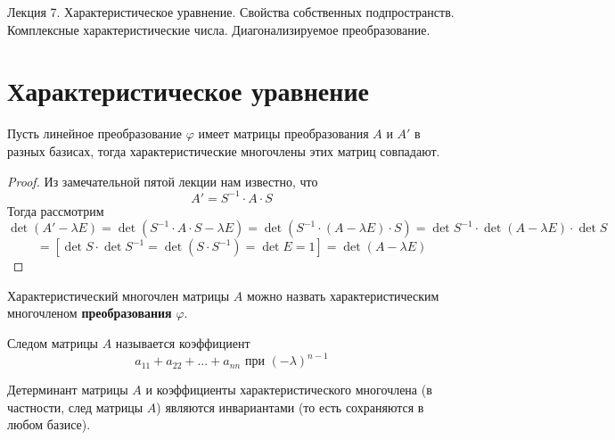 \documentclass[11pt]{article}
\begin{document}
\begin{titlepage}
    \centering
    \vspace*{\fill}  %

    {\Huge Лекция 7. Характеристическое уравнение. Свойства собственных подпространств.
    Комплексные характеристические числа. Диагонализируемое преобразование. 
    \par}

    \vspace*{\fill}  %
\end{titlepage}

\setcounter{page}{1}

\section{Характеристическое уравнение}

\begin{theorem}
    Пусть линейное преобразование $\varphi$ имеет матрицы преобразования $A$ и $A'$
    в разных базисах, тогда характеристические многочлены этих матриц совпадают.
\end{theorem}

\begin{proof}
    Из замечательной пятой лекции нам известно, что \[A' = S^{-1} \cdot A \cdot S\]
    Тогда рассмотрим \[\det(A' - \lambda E) = \det(S^{-1} \cdot A \cdot S - \lambda E) =
    \det(S^{-1} \cdot (A - \lambda E) \cdot S) = \det S^{-1} \cdot \det(A - \lambda E) \cdot \det S\]
    \[= [\det S \cdot \det S^{-1} = \det (S \cdot S^{-1}) = \det E = 1] = \det (A - \lambda E)\]
\end{proof}

\begin{consequence}
    Характеристический многочлен матрицы $A$ можно назвать характеристическим 
    многочленом \textbf{преобразования} $\varphi$.
\end{consequence}

\begin{definition}
    Следом матрицы $A$ называется коэффициент \[a_{11} + a_{22} + ... + a_{nn}
    \text{ при } (-\lambda)^{n - 1}\]
\end{definition}

\begin{consequence}
    Детерминант матрицы $A$ и коэффициенты характеристического многочлена (в частности,
    след матрицы $A$) являются инвариантами (то есть сохраняются в любом базисе).
\end{consequence}
\end{document}
